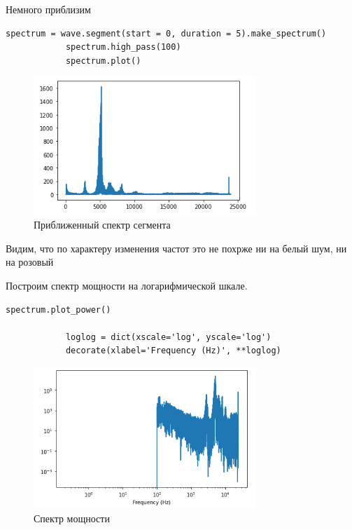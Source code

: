 \documentclass[a4paper,12pt]{article}
\begin{document}
\begin{enumerate}
		Немного приблизим
		\begin{lstlisting}[caption=Приближаем спектр]
			spectrum = wave.segment(start = 0, duration = 5).make_spectrum()
			spectrum.high_pass(100)
			spectrum.plot()
		\end{lstlisting}
		\begin{figure}[H]
			\centering
			\includegraphics[width=0.75\textwidth]{1_4.png}
			\caption{Приближенный спектр сегмента}
			\label{fig:1.4}
		\end{figure}
		
		Видим, что по характеру изменения частот это не похрже ни на белый шум, ни на розовый
		
		Построим спектр мощности на логарифмической шкале.
		\begin{lstlisting}[caption=Спектр мощности]
			spectrum.plot_power()
			
			loglog = dict(xscale='log', yscale='log')
			decorate(xlabel='Frequency (Hz)', **loglog)
		\end{lstlisting}
		\begin{figure}[H]
			\centering
			\includegraphics[width=0.75\textwidth]{1_5.png}
			\caption{Спектр мощности}
			\label{fig:1.5}
		\end{figure}
		

\end{enumerate}
\end{document}
